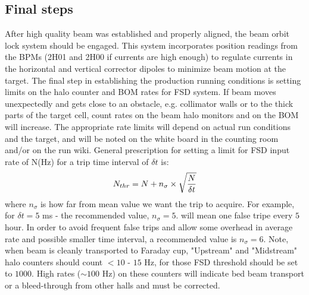 \subsection{Final steps}\label{sec:final_steps}
After high quality beam was established and properly aligned, the beam orbit lock system should be engaged. This system incorporates position readings from the BPMs (2H01 and 2H00 if currents are high enough) to regulate 
currents in the horizontal and vertical corrector dipoles to minimize beam motion at the target.  The final step in establishing the production running conditions is setting 
limits on the halo counter and BOM rates for FSD system. If beam moves unexpectedly and gets close to an obstacle, e.g. 
collimator walls or to the thick parts of the target cell, count rates on the beam halo monitors and on the BOM will increase. The appropriate rate limits will depend on actual run conditions and the target, and will be noted on the white board in the counting room and/or on the run wiki. General prescription for setting a limit for FSD input rate of N(Hz) for a trip time interval of $\delta t$ is:
\begin{eqnarray*}
N_{thr}=N+n_\sigma\times\sqrt{N\over{\delta t}}
\end{eqnarray*}
where $n_\sigma$ is how far from mean value we want the trip to acquire. For example, for $\delta t=5$ ms - the recommended value, $n_\sigma=5.$ will mean one false tripe every $5$ hour. In order to avoid frequent false trips and allow some overhead in average rate and possible smaller time interval, a recommended value is $n_\sigma=6$. Note, when beam is cleanly transported to Faraday cup, "Upstream" and "Midstream" halo counters should count $<10$ - $15$ Hz, for those FSD threshold should be set to $1000$. High rates ($\sim 100$ Hz) on these counters will indicate bed beam transport or a bleed-through from other halls and must be corrected.

